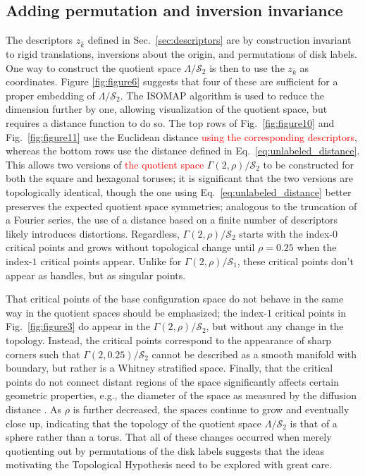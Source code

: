 \documentclass[default,iicol]{sn-jnl}%
\theoremstyle{thmstyleone}%
\theoremstyle{thmstyletwo}%
\theoremstyle{thmstylethree}%
\renewcommand{\vec}[1]{\bar{#1}}
\providecommand{\red}[1]{\textcolor{red}{#1}}
\begin{document}
\subsection{Adding permutation and inversion invariance}
\label{subsec:space_translation_permutation_inversion}

The descriptors $z_{\vec{k}}$ defined in Sec.\ \ref{sec:descriptors} are by construction invariant to rigid translations, inversions about the origin, and permutations of disk labels. One way to construct the quotient space $\Lambda / \mathcal{S}_2$ is then to use the $z_{\vec{k}}$ as coordinates. Figure \ref{fig:figure6} suggests that four of these are sufficient for a proper embedding of $\Lambda / \mathcal{S}_2$. The ISOMAP algorithm is used to reduce the dimension further by one, allowing visualization of the quotient space, but requires a distance function to do so. The top rows of Fig.\ \ref{fig:figure10} and Fig.\ \ref{fig:figure11} use the Euclidean distance \red{using the corresponding descriptors}, whereas the bottom rows use the distance defined in Eq.\ \ref{eq:unlabeled_distance}. This allows two versions of \red{the quotient space} $\Gamma(2, \rho) / \mathcal{S}_2$ to be constructed for both the square and hexagonal toruses; it is significant that the two versions are topologically identical, though the one using Eq.\ \ref{eq:unlabeled_distance} better preserves the expected quotient space symmetries; analogous to the truncation of a Fourier series, the use of a distance based on a finite number of descriptors likely introduces distortions. Regardless, $\Gamma(2, \rho) / \mathcal{S}_2$ starts with the index-$0$ critical points and grows without topological change until $\rho = 0.25$ when the index-$1$ critical points appear. Unlike for $\Gamma(2, \rho) / \mathcal{S}_1$, these critical points don't appear as handles, but as singular points. 

That critical points of the base configuration space do not behave in the same way in the quotient spaces should be emphasized; the index-$1$ critical points in Fig.\ \ref{fig:figure3} do appear in the $\Gamma(2, \rho) / \mathcal{S}_2$, but without any change in the topology. Instead, the critical points correspond to the appearance of sharp corners such that $\Gamma(2, 0.25) / \mathcal{S}_2$ cannot be described as a smooth manifold with boundary, but rather is a Whitney stratified space. Finally, that the critical points do not connect distant regions of the space significantly affects certain geometric properties, e.g., the diameter of the space as measured by the diffusion distance \cite{coifman2006diffusion}. As $\rho$ is further decreased, the spaces continue to grow and eventually close up, indicating that the topology of the quotient space $\Lambda / \mathcal{S}_2$ is that of a sphere rather than a torus. That all of these changes occurred when merely quotienting out by permutations of the disk labels suggests that the ideas motivating the Topological Hypothesis need to be explored with great care.
\end{document}

